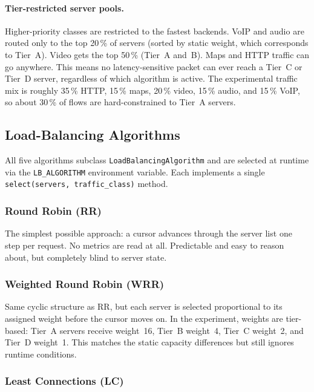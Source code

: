 \documentclass[10pt,a4paper,twocolumn]{article}
\numberwithin{figure}{section}
\numberwithin{table}{section}
\numberwithin{equation}{section}
\begin{document}
\paragraph{Tier-restricted server pools.}
Higher-priority classes are restricted to the fastest backends.
VoIP and audio are routed only to the top 20\,\% of servers (sorted by static
weight, which corresponds to Tier~A). Video gets the top 50\,\% (Tier~A and~B).
Maps and HTTP traffic can go anywhere. This means no latency-sensitive packet
can ever reach a Tier~C or Tier~D server, regardless of which algorithm is
active. The experimental traffic mix is roughly 35\,\% HTTP, 15\,\% maps,
20\,\% video, 15\,\% audio, and 15\,\% VoIP, so about 30\,\% of flows are
hard-constrained to Tier~A servers.

\subsection{Load-Balancing Algorithms}

All five algorithms subclass \texttt{LoadBalancingAlgorithm} and are selected at
runtime via the \texttt{LB\_ALGORITHM} environment variable. Each implements a
single \texttt{select(servers, traffic\_class)} method.

\subsubsection{Round Robin (RR)}

The simplest possible approach: a cursor advances through the server list one
step per request. No metrics are read at all. Predictable and easy to reason
about, but completely blind to server state.

\subsubsection{Weighted Round Robin (WRR)}

Same cyclic structure as RR, but each server is selected proportional to its
assigned weight before the cursor moves on. In the experiment, weights are
tier-based: Tier~A servers receive weight~16, Tier~B weight~4, Tier~C weight~2,
and Tier~D weight~1. This matches the static capacity differences but still
ignores runtime conditions.

\subsubsection{Least Connections (LC)}
\end{document}

